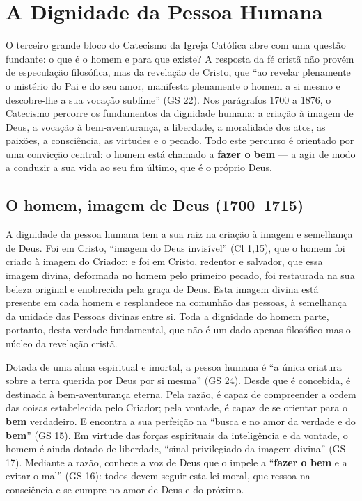 \chapter{A Dignidade da Pessoa Humana}

O terceiro grande bloco do Catecismo da Igreja Católica abre com uma questão fundante: o que é o homem e para que existe? A resposta da fé cristã não provém de especulação filosófica, mas da revelação de Cristo, que ``ao revelar plenamente o mistério do Pai e do seu amor, manifesta plenamente o homem a si mesmo e descobre-lhe a sua vocação sublime'' (GS 22). Nos parágrafos 1700 a 1876, o Catecismo percorre os fundamentos da dignidade humana: a criação à imagem de Deus, a vocação à bem-aventurança, a liberdade, a moralidade dos atos, as paixões, a consciência, as virtudes e o pecado. Todo este percurso é orientado por uma convicção central: o homem está chamado a \textbf{fazer o bem} --- a agir de modo a conduzir a sua vida ao seu fim último, que é o próprio Deus.

\section{O homem, imagem de Deus (1700--1715)}

A dignidade da pessoa humana tem a sua raiz na criação à imagem e semelhança de Deus. Foi em Cristo, ``imagem do Deus invisível'' (Cl 1,15), que o homem foi criado à imagem do Criador; e foi em Cristo, redentor e salvador, que essa imagem divina, deformada no homem pelo primeiro pecado, foi restaurada na sua beleza original e enobrecida pela graça de Deus. Esta imagem divina está presente em cada homem e resplandece na comunhão das pessoas, à semelhança da unidade das Pessoas divinas entre si. Toda a dignidade do homem parte, portanto, desta verdade fundamental, que não é um dado apenas filosófico mas o núcleo da revelação cristã.

Dotada de uma alma espiritual e imortal, a pessoa humana é ``a única criatura sobre a terra querida por Deus por si mesma'' (GS 24). Desde que é concebida, é destinada à bem-aventurança eterna. Pela razão, é capaz de compreender a ordem das coisas estabelecida pelo Criador; pela vontade, é capaz de se orientar para o \textbf{bem} verdadeiro. E encontra a sua perfeição na ``busca e no amor da verdade e do \textbf{bem}'' (GS 15). Em virtude das forças espirituais da inteligência e da vontade, o homem é ainda dotado de liberdade, ``sinal privilegiado da imagem divina'' (GS 17). Mediante a razão, conhece a voz de Deus que o impele a ``\textbf{fazer o bem} e a evitar o mal'' (GS 16): todos devem seguir esta lei moral, que ressoa na consciência e se cumpre no amor de Deus e do próximo.

